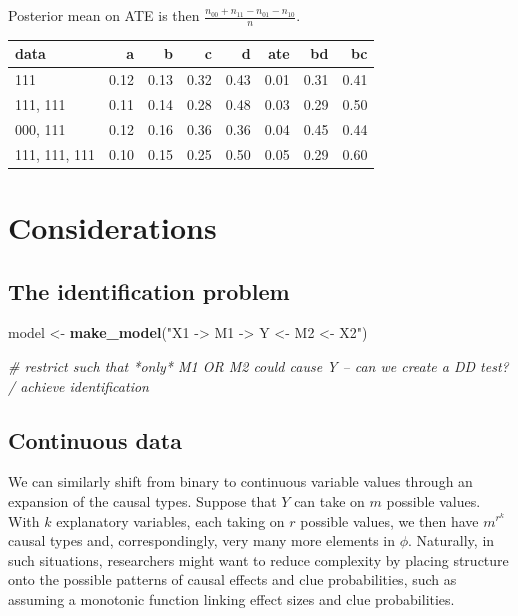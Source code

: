 \documentclass[12pt,]{book}
\newenvironment{Shaded}{\begin{snugshade}}{\end{snugshade}}
\newcommand{\CommentTok}[1]{\textcolor[rgb]{0.56,0.35,0.01}{\textit{#1}}}
\newcommand{\KeywordTok}[1]{\textcolor[rgb]{0.13,0.29,0.53}{\textbf{#1}}}
\newcommand{\NormalTok}[1]{#1}
\newcommand{\StringTok}[1]{\textcolor[rgb]{0.31,0.60,0.02}{#1}}
\begin{document}
Posterior mean on ATE is then \(\frac{n_{00} + n_{11} - n_{01} - n_{10}}n\).

\begin{tabular}{l|r|r|r|r|r|r|r}
\hline
data & a & b & c & d & ate & bd & bc\\
\hline
111 & 0.12 & 0.13 & 0.32 & 0.43 & 0.01 & 0.31 & 0.41\\
\hline
111, 111 & 0.11 & 0.14 & 0.28 & 0.48 & 0.03 & 0.29 & 0.50\\
\hline
000, 111 & 0.12 & 0.16 & 0.36 & 0.36 & 0.04 & 0.45 & 0.44\\
\hline
111, 111, 111 & 0.10 & 0.15 & 0.25 & 0.50 & 0.05 & 0.29 & 0.60\\
\hline
\end{tabular}

\hypertarget{considerations}{%
\section{Considerations}\label{considerations}}

\hypertarget{the-identification-problem}{%
\subsection{The identification problem}\label{the-identification-problem}}

\begin{Shaded}
\begin{Highlighting}[]
\NormalTok{model <-}\StringTok{ }\KeywordTok{make_model}\NormalTok{(}\StringTok{"X1 -> M1 -> Y <- M2 <- X2"}\NormalTok{)}

\CommentTok{# restrict such that *only* M1 OR M2 could cause Y -- can we create a DD test? / achieve identification}
\end{Highlighting}
\end{Shaded}

\hypertarget{continuous-data}{%
\subsection{Continuous data}\label{continuous-data}}

We can similarly shift from binary to continuous variable values through an expansion of the causal types. Suppose that \(Y\) can take on \(m\) possible values. With \(k\) explanatory variables, each taking on \(r\) possible values, we then have \(m^{r^k}\) causal types and, correspondingly, very many more elements in \(\phi\). Naturally, in such situations, researchers might want to reduce complexity by placing structure onto the possible patterns of causal effects and clue probabilities, such as assuming a monotonic function linking effect sizes and clue probabilities.
\end{document}
